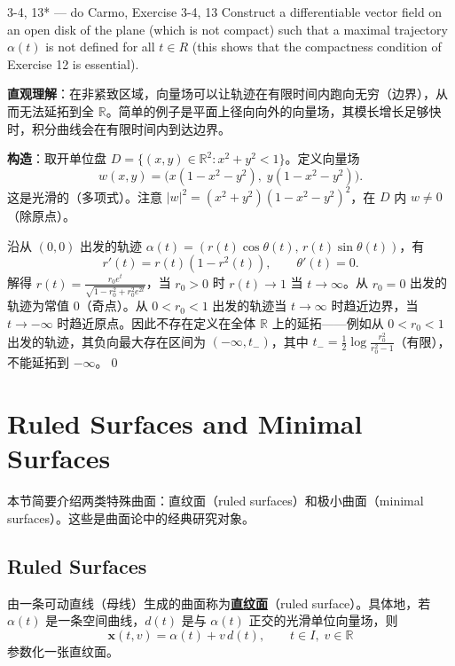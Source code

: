\begin{exercise}{3-4, 13* — do Carmo, Exercise 3-4, 13}
Construct a differentiable vector field on an open disk of the plane (which is not compact) such that a maximal trajectory $\alpha(t)$ is not defined for all $t \in R$ (this shows that the compactness condition of Exercise 12 is essential).
\end{exercise}
\begin{solution}
\textbf{直观理解}：在非紧致区域，向量场可以让轨迹在有限时间内跑向无穷（边界），从而无法延拓到全 $\mathbb{R}$。简单的例子是平面上径向向外的向量场，其模长增长足够快时，积分曲线会在有限时间内到达边界。

\textbf{构造}：取开单位盘 $D = \{(x,y)\in\mathbb{R}^2 : x^2+y^2 < 1\}$。定义向量场
\[
w(x,y) = \big(x(1-x^2-y^2),\;y(1-x^2-y^2)\big).
\]
这是光滑的（多项式）。注意 $|w|^2 = (x^2+y^2)(1-x^2-y^2)^2$，在 $D$ 内 $w \neq 0$（除原点）。

沿从 $(0,0)$ 出发的轨迹 $\alpha(t) = (r(t)\cos\theta(t),\,r(t)\sin\theta(t))$，有
\[
r'(t) = r(t)(1-r^2(t)),\qquad \theta'(t) = 0.
\]
解得 $r(t) = \frac{r_0 e^t}{\sqrt{1-r_0^2+r_0^2 e^{2t}}}$，当 $r_0>0$ 时 $r(t)\to 1$ 当 $t\to\infty$。从 $r_0=0$ 出发的轨迹为常值 $0$（奇点）。从 $0<r_0<1$ 出发的轨迹当 $t\to\infty$ 时趋近边界，当 $t\to -\infty$ 时趋近原点。因此不存在定义在全体 $\mathbb{R}$ 上的延拓——例如从 $0<r_0<1$ 出发的轨迹，其负向最大存在区间为 $(-\infty, t_-)$，其中 $t_- = \frac{1}{2}\log\frac{r_0^2}{r_0^2-1}$（有限），不能延拓到 $-\infty$。\qed
\end{solution}

\section{Ruled Surfaces and Minimal Surfaces}\label{sec:ruled-minimal}

本节简要介绍两类特殊曲面：直纹面（ruled surfaces）和极小曲面（minimal surfaces）。这些是曲面论中的经典研究对象。

\subsection{Ruled Surfaces}\label{sec:ruled-surfaces}

\begin{Definition}\label{def:ruled-surface}
由一条可动直线（母线）生成的曲面称为\textbf{\underline{直纹面}}（ruled surface）。具体地，若 $\alpha(t)$ 是一条空间曲线，$d(t)$ 是与 $\alpha(t)$ 正交的光滑单位向量场，则
\[
\mathbf{x}(t,v) = \alpha(t) + v\,d(t),\qquad t \in I,\; v \in \mathbb{R}
\]
参数化一张直纹面。
\end{Definition}

